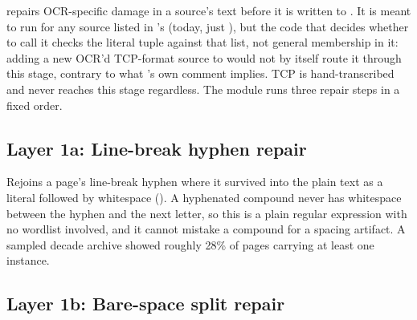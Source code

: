 \documentclass[11pt]{article}
\begin{document}
 repairs OCR-specific damage in a source's
text before it is written to . It is meant to run
for any source listed in 's  (today,
just \code{[british, bl\_19c]}), but the code that decides whether to
call it checks the literal tuple  against
that list, not general membership in it: adding a new OCR'd TCP-format
source to  would not by itself route it through this
stage, contrary to what 's own comment implies. TCP is
hand-transcribed and never reaches this stage regardless. The module
runs three repair steps in a fixed order.

\subsection{Layer 1a: Line-break hyphen repair}

Rejoins a page's line-break
hyphen where it survived into the plain text as a literal \code{-}
followed by whitespace (). A hyphenated compound
never has whitespace between the hyphen and the next letter, so this is
a plain regular expression with no wordlist involved, and it cannot
mistake a compound for a spacing artifact. A sampled decade archive
showed roughly 28\% of pages carrying at least one instance.

\subsection{Layer 1b: Bare-space split repair}
\end{document}
